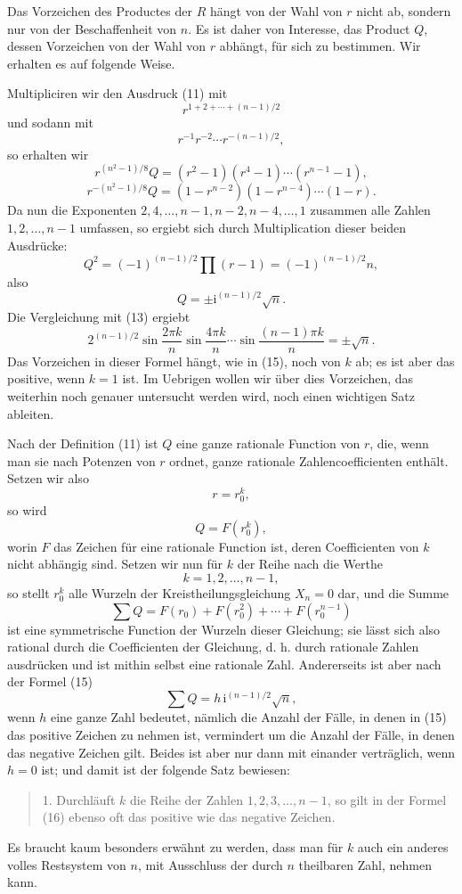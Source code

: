 \documentclass[11pt]{article}
\providecommand{\ii}{\mathrm{i}}
\begin{document}
Das Vorzeichen des Productes der $R$ hängt von der Wahl von $r$ nicht ab, sondern nur von der Beschaffenheit von $n$. Es ist daher von Interesse, das Product $Q$, dessen Vorzeichen von der Wahl von $r$ abhängt, für sich zu bestimmen. Wir erhalten es auf folgende Weise.

Multipliciren wir den Ausdruck (11) mit
\[
        r^{1+2+\cdots+(n-1)/2}
\]
und sodann mit
\[
        r^{-1}r^{-2}\cdots r^{-(n-1)/2},
\]
so erhalten wir
\[
        r^{(n^2-1)/8}Q=(r^2-1)(r^4-1)\cdots(r^{n-1}-1),
\]
\[
        r^{-(n^2-1)/8}Q=(1-r^{n-2})(1-r^{n-4})\cdots(1-r).
\]
Da nun die Exponenten $2,4,\ldots,n-1,n-2,n-4,\ldots,1$ zusammen alle Zahlen $1,2,\ldots,n-1$ umfassen, so ergiebt sich durch Multiplication dieser beiden Ausdrücke:
\[
        Q^2=(-1)^{(n-1)/2}\prod(r-1)=(-1)^{(n-1)/2}n,
\]
also
\[
\tag{15}       Q=\pm \ii^{(n-1)/2}\sqrt n.
\]
Die Vergleichung mit (13) ergiebt
\[
\tag{16}       2^{(n-1)/2}\sin\frac{2\pi k}{n}\sin\frac{4\pi k}{n}\cdots\sin\frac{(n-1)\pi k}{n}=\pm\sqrt n.
\]
Das Vorzeichen in dieser Formel hängt, wie in (15), noch von $k$ ab; es ist aber das positive, wenn $k=1$ ist. Im Uebrigen wollen wir über dies Vorzeichen, das weiterhin noch genauer untersucht werden wird, noch einen wichtigen Satz ableiten.

Nach der Definition (11) ist $Q$ eine ganze rationale Function von $r$, die, wenn man sie nach Potenzen von $r$ ordnet, ganze rationale Zahlencoefficienten enthält. Setzen wir also
\[
        r=r_0^k,
\]
so wird
\[
        Q=F(r_0^k),
\]
worin $F$ das Zeichen für eine rationale Function ist, deren Coefficienten von $k$ nicht abhängig sind. Setzen wir nun für $k$ der Reihe nach die Werthe
\[
        k=1,2,\ldots,n-1,
\]
so stellt $r_0^k$ alle Wurzeln der Kreistheilungsgleichung $X_n=0$ dar, und die Summe
\[
        \sum Q=F(r_0)+F(r_0^2)+\cdots+F(r_0^{n-1})
\]
ist eine symmetrische Function der Wurzeln dieser Gleichung; sie lässt sich also rational durch die Coefficienten der Gleichung, d. h. durch rationale Zahlen ausdrücken und ist mithin selbst eine rationale Zahl. Andererseits ist aber nach der Formel (15)
\[
        \sum Q=h\,\ii^{(n-1)/2}\sqrt n,
\]
wenn $h$ eine ganze Zahl bedeutet, nämlich die Anzahl der Fälle, in denen in (15) das positive Zeichen zu nehmen ist, vermindert um die Anzahl der Fälle, in denen das negative Zeichen gilt. Beides ist aber nur dann mit einander verträglich, wenn $h=0$ ist; und damit ist der folgende Satz bewiesen:
\begin{quote}
1. Durchläuft $k$ die Reihe der Zahlen $1,2,3,\ldots,n-1$, so gilt in der Formel (16) ebenso oft das positive wie das negative Zeichen.
\end{quote}
Es braucht kaum besonders erwähnt zu werden, dass man für $k$ auch ein anderes volles Restsystem von $n$, mit Ausschluss der durch $n$ theilbaren Zahl, nehmen kann.
\end{document}
